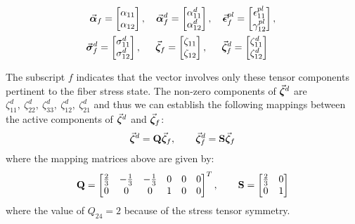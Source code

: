 \begin{gather}
	\bvec{\alpha}_f = \begin{bmatrix} \alpha_{11} \\ \alpha_{12} 
	\end{bmatrix},\quad
	\bvec{\alpha}^d_f = \begin{bmatrix} \alpha_{11}^d \\ \alpha_{12}^d 
	\end{bmatrix},\quad
	\bvec{\epsilon}^{pl}_f = \begin{bmatrix} \epsilon^{pl}_{11} \\ 
		\gamma^{pl}_{12} \end{bmatrix},\nonumber\\
	\hspace{-0.4cm}\bvec{\sigma}^d_f = \begin{bmatrix} \sigma^d_{11} \\ 
	\sigma^d_{12}
	\end{bmatrix},\quad\hspace{0.15cm}
	\bvec{\zeta}_f = \begin{bmatrix}
		\zeta_{11} \\ \zeta_{12}
	\end{bmatrix},\quad\hspace{0.15cm}
	\bvec{\zeta}_f^d = \begin{bmatrix}
		\zeta_{11}^d \\ \zeta_{12}^d
	\end{bmatrix}\nonumber
\end{gather}

The subscript $f$ indicates that the vector involves only these tensor 
components pertinent to the fiber stress state. The non-zero components of 
$\vec{\bm{\zeta}}^d$ are $\zeta_{11}^d,\ \zeta_{22}^d,\ \zeta_{33}^d,\
\zeta_{12}^d,\ \zeta_{21}^d$ and thus we can establish the following mappings
between the active components of $\vec{\bm{\zeta}}^d$ and $\vec{\bm{\zeta}}_f$:
\begin{equation}
	\vec{\bm{\zeta}}^d = \mathbf{Q}\vec{\bm{\zeta}}_f,\qquad \vec{\bm{\zeta}}^d_f =
	\mathbf{S}\vec{\bm{\zeta}}_f
	\label{eq:MAPPING}
\end{equation}
where the mapping matrices above are given by:
\begin{equation}
	\mathbf{Q} = \begin{bmatrix}
		\frac{2}{3} & -\frac{1}{3} & -\frac{1}{3} & 0 & 0 & 0 \\
		0 & 0 & 0 & 1 & 0 & 0
	\end{bmatrix}^T,\qquad \mathbf{S} = \begin{bmatrix}
		\frac{2}{3} & 0\\
		0 & 1
	\end{bmatrix}
	\label{eq:MAPPING_MATRIX}
\end{equation}
where the value of $Q_{24} = 2$ because of the stress tensor symmetry.

